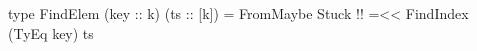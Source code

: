 \begin{code}
type FindElem (key :: k) (ts :: [k]) =
  FromMaybe Stuck  !!
    =<< FindIndex (TyEq key) ts
\end{code}
